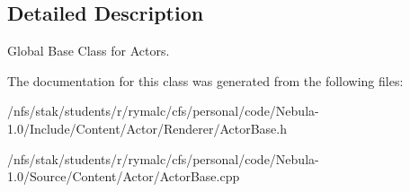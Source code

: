\subsection{Detailed Description}
Global Base Class for Actors. 

The documentation for this class was generated from the following files:\begin{DoxyCompactItemize}
\item 
/nfs/stak/students/r/rymalc/cfs/personal/code/Nebula-\/1.0/Include/Content/Actor/Renderer/ActorBase.h\item 
/nfs/stak/students/r/rymalc/cfs/personal/code/Nebula-\/1.0/Source/Content/Actor/ActorBase.cpp\end{DoxyCompactItemize}
